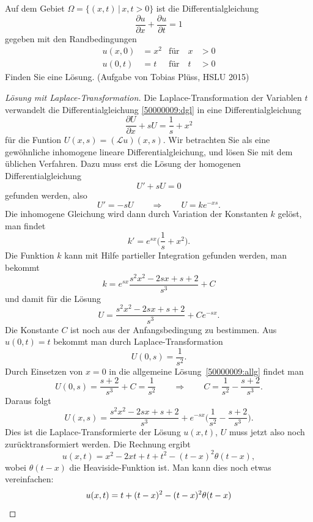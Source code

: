 Auf dem Gebiet $\Omega = \{(x,t)\,|\, x,t > 0\}$ ist die Differentialgleichung
\begin{equation}
\frac{\partial u}{\partial x}
+
\frac{\partial u}{\partial t}
=
1
\label{50000009:dgl}
\end{equation}
gegeben mit den Randbedingungen
\begin{equation}
\begin{aligned}
u(x,0)&=x^2&\text{für}\quad x&>0\\
u(0,t)&=t  &\text{für}\quad t&>0
\end{aligned}
\end{equation}
Finden Sie eine Lösung.
(Aufgabe von Tobias Plüss, HSLU 2015)

\begin{proof}[Lösung mit Laplace-Transformation]
Die Laplace-Transformation der Variablen $t$ verwandelt die
Differentialgleichung \eqref{50000009:dgl} in eine Differentialgleichung
\[
\frac{\partial U}{\partial x}+sU=\frac1s+x^2
\]
für die Funtion $U(x,s)=(\mathscr{L}u)(x,s)$. Wir betrachten Sie
als eine gewöhnliche inhomogene lineare Differentialgleichung,
und lösen Sie mit dem üblichen Verfahren. Dazu muss erst die Lösung 
der homogenen Differentialgleichung
\[
U' + sU = 0
\]
gefunden werden, also
\[
U'=-sU
\qquad\Rightarrow\qquad
U=ke^{-xs}.
\]
Die inhomogene Gleichung wird dann durch Variation der Konstanten $k$ gelöst,
man findet
\[
k' = e^{sx}\biggl(\frac1s+x^2\biggr).
\]
Die Funktion $k$ kann mit Hilfe partieller Integration gefunden werden,
man bekommt
\[
k=e^{sx}\frac{s^2x^2-2sx+s+2}{s^3}+C
\]
und damit für die Lösung
\begin{equation}
U=\frac{s^2x^2-2sx+s+2}{s^3}+Ce^{-sx}.
\label{50000009:allg}
\end{equation}
Die Konstante $C$ ist noch aus der Anfangsbedingung zu bestimmen. Aus
$u(0,t)=t$ bekommt man durch Laplace-Transformation
\[
U(0,s)=\frac1{s^2}.
\]
Durch Einsetzen von $x=0$ in die allgemeine Lösung~\eqref{50000009:allg}
findet man
\[
U(0,s)=\frac{s+2}{s^3}+C=\frac1{s^2}
\qquad\Rightarrow\qquad
C= \frac1{s^2} - \frac{s+2}{s^3}.
\]
Daraus folgt
\[
U(x,s)=\frac{s^2x^2-2sx+s+2}{s^3}
+
e^{-sx}\biggl(\frac1{s^2}-\frac{s+2}{s^3}\biggr).
\]
Dies ist die Laplace-Transformierte der Lösung $u(x,t)$, $U$ muss jetzt
also noch zurücktransformiert werden.
Die Rechnung ergibt
\[
u(x,t)=x^2-2xt+t+t^2-(t-x)^2\theta(t-x),
\]
wobei $\theta(t-x)$ die Heaviside-Funktion ist.
Man kann dies noch etwas vereinfachen:
\begin{align}
u(x,t)
&=
t+(t-x)^2 -(t-x)^2\theta(t-x)
\notag
\\

\end{align}
\end{proof}
